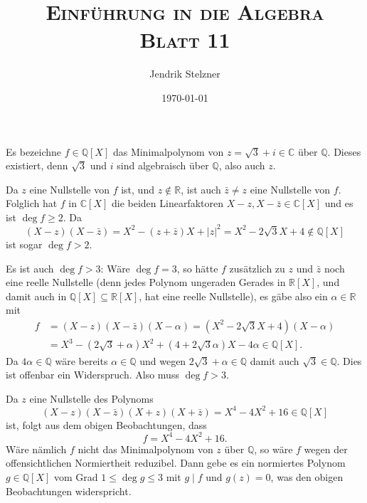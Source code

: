 \documentclass[a4paper,10pt]{article}
\title{\textsc{Einführung in die Algebra \\ \Large Blatt 11}}
\author{Jendrik Stelzner}
\date{\today}
\theoremstyle{definition}
\newcommand{\Q}{\mathbb{Q}}
\newcommand{\R}{\mathbb{R}}
\newcommand{\C}{\mathbb{C}}
\begin{document}
\maketitle





\section{}
Es bezeichne $f \in \Q[X]$ das Minimalpolynom von $z = \sqrt{3}+i \in \C$ über $\Q$. Dieses existiert, denn $\sqrt{3}$ und $i$ sind algebraisch über $\Q$, also auch $z$.

Da $z$ eine Nullstelle von $f$ ist, und $z \not\in \R$, ist auch $\bar{z} \neq z$ eine Nullstelle von $f$. Folglich hat $f$ in $\C[X]$ die beiden Linearfaktoren $X-z, X-\bar{z} \in \C[X]$ und es ist $\deg f \geq 2$. Da
\[
 (X-z)(X-\bar{z}) = X^2 -(z+\bar{z})X + |z|^2 = X^2 -2\sqrt{3}X + 4 \not\in \Q[X]
\]
ist sogar $\deg f > 2$.

Es ist auch $\deg f > 3$: Wäre $\deg f = 3$, so hätte $f$ zusätzlich zu $z$ und $\bar{z}$ noch eine reelle Nullstelle (denn jedes Polynom ungeraden Gerades in $\R[X]$, und damit auch in $\Q[X] \subseteq \R[X]$, hat eine reelle Nullstelle), es gäbe also ein $\alpha \in \R$ mit
\begin{align*}
 f &= (X-z)(X-\bar{z})(X-\alpha) = (X^2 -2\sqrt{3}X + 4)(X-\alpha) \\
   &= X^3 - (2\sqrt{3}+\alpha)X^2 + (4+2\sqrt{3}\alpha)X -4\alpha \in \Q[X].
\end{align*}
Da $4\alpha \in \Q$ wäre bereits $\alpha \in \Q$ und wegen $2\sqrt{3} + \alpha \in \Q$ damit auch $\sqrt{3} \in \Q$. Dies ist offenbar ein Widerspruch. Also muss $\deg f > 3$.

Da $z$ eine Nullstelle des Polynoms
\[
 (X-z)(X-\bar{z})(X+z)(X+\bar{z})
 = X^4 -4X^2 + 16 \in \Q[X]
\]
ist, folgt aus dem obigen Beobachtungen, dass
\[
 f = X^4 -4X^2 + 16.
\]
Wäre nämlich $f$ nicht das Minimalpolynom von $z$ über $\Q$, so wäre $f$ wegen der offensichtlichen Normiertheit reduzibel. Dann gebe es ein normiertes Polynom $g \in \Q[X]$ vom Grad $1 \leq \deg g \leq 3$ mit $g \mid f$ und $g(z) = 0$, was den obigen Beobachtungen widerspricht.
\end{document}
